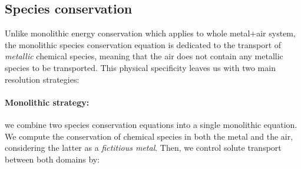 \subsection{Species conservation} \label{sec:monolithic_species}

Unlike monolithic energy conservation which applies to whole metal+air system, the monolithic species conservation equation is dedicated
to the transport of \emph{metallic} chemical species, meaning that the air does not contain any metallic species to be transported.
This physical specificity leaves us with two main resolution strategies:

\paragraph{Monolithic strategy:}
we combine two species conservation equations into a single monolithic equation. 
We compute the conservation of chemical species in both the metal and the air, considering the latter as
a \emph{fictitious metal}. Then, we control solute transport between both domains by:

